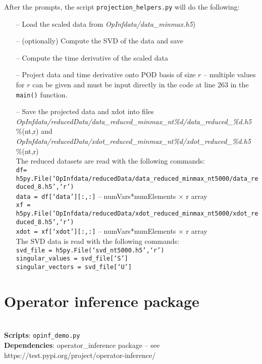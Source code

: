 \documentclass[11pt]{article} %
\newcommand{\code}[1]{\colorbox{light-gray}{\texttt{#1}}}
\begin{document}
\noindent After the prompts, the script \code{projection\_helpers.py} will do the following:
\begin{itemize}
\item[--] Load the scaled data from \textit{OpInfdata/data\_minmax.h5}) 
\item[--] (optionally) Compute the SVD of the data and save 
\item[--] Compute the time derivative of the scaled data
\item[--] Project data and time derivative onto POD basis of size $r$ -- multiple values for $r$ can be given and must be input directly in the code at line 263 in the \code{main()} function.
\item[--] Save the projected data and xdot into files \\ \textit{OpInfdata/reducedData/data\_reduced\_minmax\_nt\%d/data\_reduced\_\%d.h5} \%(nt,r) and \\ \textit{OpInfdata/reducedData/xdot\_reduced\_minmax\_nt\%d/xdot\_reduced\_\%d.h5} \%(nt,r)\\

The reduced datasets are read with the following commands:\\
\code{df= h5py.File(`OpInfdata/reducedData/data\_reduced\_minmax\_nt5000/data\_reduced\_8.h5',`r')}\\
\code{data = df[`data'][:,:]} -- numVars*numElements $\times$ r array\\
\code{xf = h5py.File(`OpInfdata/reducedData/xdot\_reduced\_minmax\_nt5000/xdot\_reduced\_8.h5',`r')}\\
\code{xdot = xf[`xdot'][:,:]} -- numVars*numElements $\times$ r array\\

The SVD data is read with the following commands:\\
\code{svd\_file = h5py.File(`svd\_nt5000.h5',`r')}\\
\code{singular\_values = svd\_file[`S']}\\
\code{singular\_vectors = svd\_file[`U']}

\end{itemize}

\section{Operator inference package}
\hrulefill\\
\textbf{Scripts}: \code{opinf\_demo.py}\\
\textbf{Dependencies}: operator\_inference package -- see https://test.pypi.org/project/operator-inference/
\end{document}
